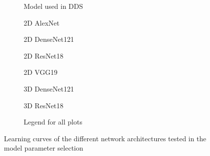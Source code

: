 \begin{subappendices}
\begin{figure}
\begin{subfigure}[t]{\modelplotwidth}
    \centering
    \caption{Model used in \gls{DDS}}\label{fig:DDSNet2D}
\end{subfigure}
\begin{subfigure}[t]{\modelplotwidth}
    \centering
    \caption{2D AlexNet}\label{fig:AlexNet2D}
\end{subfigure}
\begin{subfigure}[t]{\modelplotwidth}
    \centering
    \caption{2D DenseNet121}\label{fig:DenseNet2D}
\end{subfigure}
\begin{subfigure}[t]{\modelplotwidth}
    \centering
    \caption{2D ResNet18}\label{fig:ResNet2D}
\end{subfigure}

\begin{subfigure}[t]{\modelplotwidth}
    \centering
    \caption{2D VGG19}\label{fig:VGG2D}
\end{subfigure}
\begin{subfigure}[t]{\modelplotwidth}
    \centering
    \caption{3D DenseNet121}\label{fig:DenseNet3D}
\end{subfigure}
\begin{subfigure}[t]{\modelplotwidth}
    \centering
    \caption{3D ResNet18}\label{fig:ResNet3D}
\end{subfigure}
\begin{subfigure}[b]{\modelplotwidth}
    \caption{Legend for all plots}
\end{subfigure}

\caption{Learning curves of the different network architectures tested in the model parameter selection}\label{fig:modellearningcurves}
\end{figure}


\end{subappendices}
